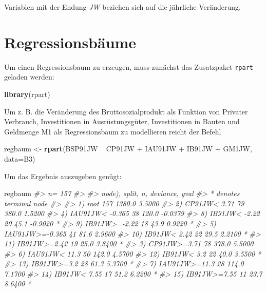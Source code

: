 \documentclass[12pt,]{book}
\makeatletter
\newenvironment{Shaded}{\begin{snugshade}}{\end{snugshade}}
\newcommand{\KeywordTok}[1]{\textcolor[rgb]{0.13,0.29,0.53}{\textbf{{#1}}}}
\newcommand{\DataTypeTok}[1]{\textcolor[rgb]{0.13,0.29,0.53}{{#1}}}
\newcommand{\StringTok}[1]{\textcolor[rgb]{0.31,0.60,0.02}{{#1}}}
\newcommand{\CommentTok}[1]{\textcolor[rgb]{0.56,0.35,0.01}{\textit{{#1}}}}
\newcommand{\NormalTok}[1]{{#1}}
\newenvironment{kframe}{%
\medskip{}
\setlength{\fboxsep}{.8em}
 \def\at@end@of@kframe{}%
 \ifinner\ifhmode%
  \def\at@end@of@kframe{\end{minipage}}%
  \begin{minipage}{\columnwidth}%
 \fi\fi%
 \def\FrameCommand##1{\hskip\@totalleftmargin \hskip-\fboxsep
 \colorbox{shadecolor}{##1}\hskip-\fboxsep
     \hskip-\linewidth \hskip-\@totalleftmargin \hskip\columnwidth}%
 \MakeFramed {\advance\hsize-\width
   \@totalleftmargin\z@ \linewidth\hsize
   \@setminipage}}%
 {\par\unskip\endMakeFramed%
 \at@end@of@kframe}
\renewenvironment{Shaded}{\begin{kframe}}{\end{kframe}}
\makeatother
\begin{document}
Variablen mit der Endung \emph{JW} beziehen sich auf die jährliche
Veränderung.

\section{Regressionsbäume}\label{regressionsbaume}

Um einen Regressionsbaum zu erzeugen, muss zunächst das Zusatzpaket
\texttt{rpart} geladen werden:

\begin{Shaded}
\begin{Highlighting}[]
\KeywordTok{library}\NormalTok{(rpart)}
\end{Highlighting}
\end{Shaded}

Um z. B. die Veränderung des Bruttosozialprodukt als Funktion von
Privater Verbrauch, Investitionen in Ausrüstungsgüter, Investitionen in
Bauten und Geldmenge M1 als Regressionsbaum zu modellieren reicht der
Befehl

\begin{Shaded}
\begin{Highlighting}[]
\NormalTok{regbaum <-}\StringTok{ }\KeywordTok{rpart}\NormalTok{(BSP91JW ~}\StringTok{ }\NormalTok{CP91JW +}\StringTok{ }\NormalTok{IAU91JW +}\StringTok{ }\NormalTok{IB91JW +}\StringTok{ }\NormalTok{GM1JW, }\DataTypeTok{data=}\NormalTok{B3)}
\end{Highlighting}
\end{Shaded}

Um das Ergebnis auszugeben genügt:

\begin{Shaded}
\begin{Highlighting}[]
\NormalTok{regbaum}
\CommentTok{#> n= 157 }
\CommentTok{#> }
\CommentTok{#> node), split, n, deviance, yval}
\CommentTok{#>       * denotes terminal node}
\CommentTok{#> }
\CommentTok{#>  1) root 157 1380.0  3.5000  }
\CommentTok{#>    2) CP91JW< 3.71 79  380.0  1.5200  }
\CommentTok{#>      4) IAU91JW< -0.365 38  120.0 -0.0379  }
\CommentTok{#>        8) IB91JW< -2.22 20   45.1 -0.9020 *}
\CommentTok{#>        9) IB91JW>=-2.22 18   43.9  0.9220 *}
\CommentTok{#>      5) IAU91JW>=-0.365 41   81.6  2.9600  }
\CommentTok{#>       10) IB91JW< 2.42 22   29.5  2.2100 *}
\CommentTok{#>       11) IB91JW>=2.42 19   25.0  3.8400 *}
\CommentTok{#>    3) CP91JW>=3.71 78  378.0  5.5000  }
\CommentTok{#>      6) IAU91JW< 11.3 50  142.0  4.5700  }
\CommentTok{#>       12) IB91JW< 3.2 22   40.0  3.5500 *}
\CommentTok{#>       13) IB91JW>=3.2 28   61.3  5.3700 *}
\CommentTok{#>      7) IAU91JW>=11.3 28  114.0  7.1700  }
\CommentTok{#>       14) IB91JW< 7.55 17   51.2  6.2200 *}
\CommentTok{#>       15) IB91JW>=7.55 11   23.7  8.6400 *}
\end{Highlighting}
\end{Shaded}
\end{document}
